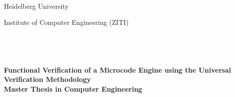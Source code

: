 


%


\thispagestyle{empty}




\begin{verbatim}


\end{verbatim}

\begin{center}
\Large{Heidelberg University}\\
\end{center}


\begin{center}
\Large{Institute of Computer Engineering (ZITI)}
\end{center}
\begin{verbatim}




\end{verbatim}
\begin{center}
\doublespacing
\textbf{\LARGE{Functional Verification of a Microcode Engine using the Universal Verification Methodology}}\\
\medskip
\textbf{\large{Master Thesis in Computer Engineering}}\\
\singlespacing
\begin{verbatim}

\end{verbatim}
\end{center}
\begin{verbatim}

\end{verbatim}
\begin{center}

\end{center}

